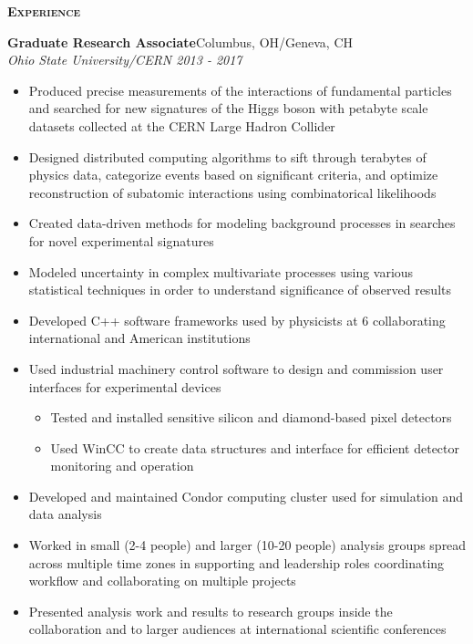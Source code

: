 \documentclass[line]{letter}
\begin{document}
{\vspace{3pt} \Large \textsc{\textbf{Experience}}}
\begin{addmargin}[1em]{1em}
{\large {\bf Graduate Research Associate}\hfill Columbus, OH/Geneva, CH\vspace{1mm}}\\
{\large \it Ohio State University/CERN \hfill  2013 - 2017} \\
\vspace{-6mm}
\begin{itemize}[leftmargin=5mm]
\item Produced precise measurements of the interactions of fundamental particles and searched for new signatures of the Higgs boson with petabyte scale datasets collected at the CERN Large Hadron Collider
\item Designed distributed computing algorithms to sift through terabytes of physics data, categorize events based on significant criteria, and optimize reconstruction of subatomic interactions using combinatorical likelihoods 
\item Created data-driven methods for modeling background processes in searches for novel experimental signatures 
\item Modeled uncertainty in complex multivariate processes using various statistical techniques in order to understand significance of observed results
\item Developed C++ software frameworks used by physicists at 6 collaborating international and American institutions
\item Used industrial machinery control software to design and commission user interfaces for experimental devices
\begin{itemize}
\item Tested and installed sensitive silicon and diamond-based pixel detectors
\item Used WinCC to create data structures and interface for efficient detector monitoring and operation
\end{itemize}
\item Developed and maintained Condor computing cluster used for simulation and data analysis
\item Worked in small (2-4 people) and larger (10-20 people) analysis groups spread across multiple time zones in supporting and leadership roles coordinating workflow and collaborating on multiple projects
\item Presented analysis work and results to research groups inside the collaboration and to larger audiences at international scientific conferences
\end{itemize}


\end{addmargin}
\end{document}
